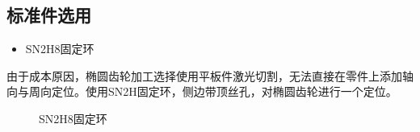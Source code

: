 \documentclass[12pt]{article}
\begin{document}
\begin{CJK}{UTF8}{gbsn}
\subsection{标准件选用}
\begin{itemize}
\item SN2H8固定环
\end{itemize}
由于成本原因，椭圆齿轮加工选择使用平板件激光切割，无法直接在零件上添加轴向与周向定位。使用SN2H固定环，侧边带顶丝孔，对椭圆齿轮进行一个定位。
\begin{figure}[H]
{}
\quad
{}
\caption{SN2H8固定环}
\end{figure}


\end{CJK}
\end{document}
